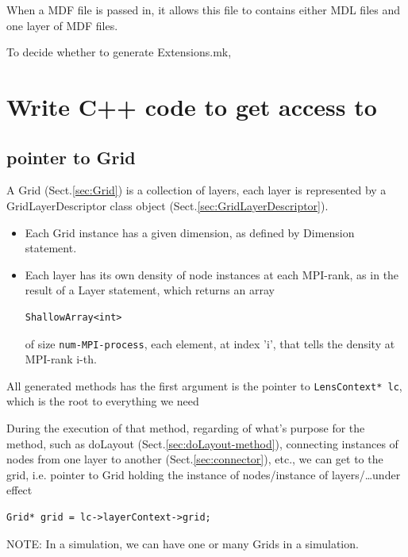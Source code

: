 When a MDF file is passed in, it allows this file to contains either MDL files and one layer of MDF files.

To decide whether to generate Extensions.mk, 


\section{Write C++ code to get access to}
\label{sec:GSL-C++-how-to-get-access-to}

\subsection{ pointer to Grid}
\label{sec:Grid-access-to-it-C++}

A Grid (Sect.\ref{sec:Grid}) is a collection of layers, each layer is
represented by a GridLayerDescriptor class object
(Sect.\ref{sec:GridLayerDescriptor}). 
\begin{itemize}
  \item  Each Grid instance has a given dimension, as defined by Dimension
  statement.

  \item Each layer has its own density of node instances at each MPI-rank, as
  in the result of a Layer statement, which returns an array
\begin{verbatim}
ShallowArray<int>
\end{verbatim}
of size \verb!num-MPI-process!, each element, at index 'i', that tells the
density at MPI-rank i-th.

\end{itemize}

All generated methods has the first argument is the pointer to
\verb!LensContext* lc!, which is the root to everything we need

During the execution of that method, regarding of what's purpose for the
method, such as doLayout (Sect.\ref{sec:doLayout-method}), connecting instances
of nodes from one layer to another (Sect.\ref{sec:connector}), etc., we can get
to the grid, i.e. pointer to Grid holding the instance of nodes/instance of
layers/\ldots under effect
\begin{lstlisting}
Grid* grid = lc->layerContext->grid;
\end{lstlisting}
NOTE: In a simulation, we can have one or many Grids in a
simulation.

